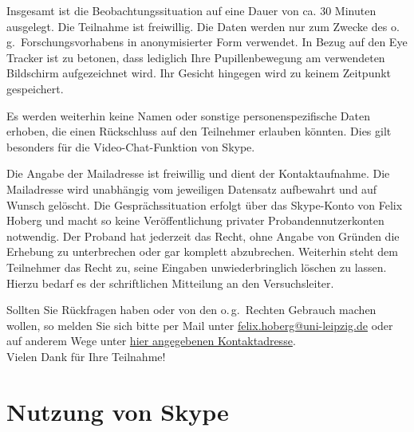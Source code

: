 \begin{framed}
\noindent Insgesamt ist die Beobachtungssituation auf eine Dauer von ca. 30 Minuten ausgelegt. Die Teilnahme ist freiwillig. Die Daten werden nur zum Zwecke des o.\,g.\ Forschungsvorhabens in anonymisierter Form verwendet. In Bezug auf den Eye Tracker ist zu betonen, dass lediglich Ihre Pupillenbewegung am verwendeten Bildschirm aufgezeichnet wird. Ihr Gesicht hingegen wird zu keinem Zeitpunkt gespeichert.

Es werden weiterhin keine Namen oder sonstige personenspezifische Daten erhoben, die einen Rückschluss auf den Teilnehmer erlauben könnten. Dies gilt besonders für die Video-Chat-Funktion von Skype.

Die Angabe der Mailadresse ist freiwillig und dient der Kontaktaufnahme. Die Mailadresse wird unabhängig vom jeweiligen Datensatz aufbewahrt und auf Wunsch gelöscht. Die Gesprächssituation erfolgt über das Skype-Konto von Felix Hoberg und macht so keine Veröffentlichung privater Probandennutzerkonten notwendig. Der Proband hat jederzeit das Recht, ohne Angabe von Gründen die Erhebung zu unterbrechen oder gar komplett abzubrechen. Weiterhin steht dem Teilnehmer das Recht zu, seine Eingaben unwiederbringlich löschen zu lassen. Hierzu bedarf es der schriftlichen Mitteilung an den Versuchsleiter.

Sollten Sie Rückfragen haben oder von den o.\,g.\ Rechten Gebrauch machen wollen, so melden Sie sich bitte per Mail unter \href{mailto:felix.hoberg@uni-leipzig.de}{felix.hoberg@uni-leipzig.de} oder auf anderem Wege unter \href{https://ialt.philol.uni-leipzig.de/institut/kontakte/felix-hoberg/}{hier angegebenen Kontaktadresse}.\\

\noindent Vielen Dank für Ihre Teilnahme!
\end{framed}


%
%
%



\section*{Nutzung von Skype}


